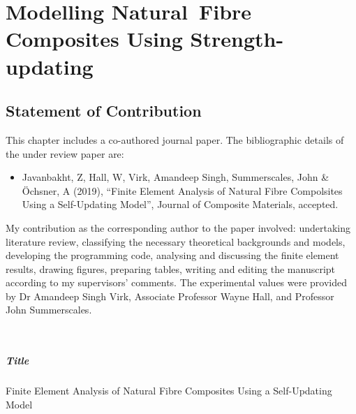 
\chapter{Modelling Natural~Fibre Composites Using Strength-updating}\label{chap:p6}
\section*{Statement of Contribution}
\vspace{-0.5\baselineskip}
	This chapter includes a co-authored journal paper. The bibliographic details of the under review paper are:
\begin{itemize}
	\item Javanbakht, Z, Hall, W, Virk, Amandeep Singh, Summerscales, John \& Öchsner, A (2019), ``Finite Element Analysis of Natural Fibre Compolsites Using a Self-Updating Model'', Journal of Composite Materials, accepted.
\end{itemize}
	My contribution as the corresponding author to the paper involved: undertaking literature review, classifying the necessary theoretical backgrounds and models, developing the programming code, analysing and discussing the finite element results, drawing figures, preparing tables, writing and editing the manuscript according to my supervisors’ comments. The experimental values were provided by Dr Amandeep Singh Virk, Associate Professor Wayne Hall, and Professor John Summerscales.
	

\Zia\\
\Wayne
\vfill
\pagebreak


\paragraph{Title} Finite Element Analysis of Natural Fibre Composites Using a Self-Updating Model

